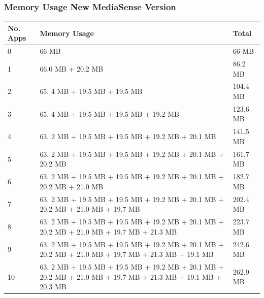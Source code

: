 \subsubsection{Memory Usage New MediaSense Version}
\begin{center}
    \begin{tabular}{ | l | p{9cm} | l |}
    \hline
    No. Apps			 								& Memory Usage 																														& Total\\ \hline
    0 													& 66 MB 																															& 66 MB\\ \hline
    1 													& 66.0 MB + 20.2 MB 																												& 86.2 MB\\ \hline
    2 													& 65. 4 MB + 19.5 MB + 19.5 MB  																									& 104.4 MB\\ \hline
    3 													& 65. 4 MB + 19.5 MB + 19.5 MB + 19.2 MB  																							& 123.6 MB\\ \hline
    4 													& 63. 2 MB + 19.5 MB + 19.5 MB + 19.2 MB + 20.1 MB 																				& 141.5 MB\\ \hline
    5													& 63. 2 MB + 19.5 MB + 19.5 MB + 19.2 MB + 20.1 MB + 20.2 MB																		& 161.7 MB\\ \hline
    6													& 63. 2 MB + 19.5 MB + 19.5 MB + 19.2 MB + 20.1 MB + 20.2 MB + 21.0 MB															& 182.7 MB\\ \hline	
    7													& 63. 2 MB + 19.5 MB + 19.5 MB + 19.2 MB + 20.1 MB + 20.2 MB + 21.0 MB + 19.7 MB													& 202.4 MB\\ \hline		
    8													& 63. 2 MB + 19.5 MB + 19.5 MB + 19.2 MB + 20.1 MB + 20.2 MB + 21.0 MB + 19.7 MB + 21.3 MB										& 223.7 MB\\ \hline
    9													& 63. 2 MB + 19.5 MB + 19.5 MB + 19.2 MB + 20.1 MB + 20.2 MB + 21.0 MB + 19.7 MB + 21.3 MB + 19.1 MB								& 242.6 MB\\ \hline
    10													& 63. 2 MB + 19.5 MB + 19.5 MB + 19.2 MB + 20.1 MB + 20.2 MB + 21.0 MB + 19.7 MB + 21.3 MB + 19.1 MB + 20.3 MB					& 262.9 MB\\ \hline
    \end{tabular}
\end{center}




